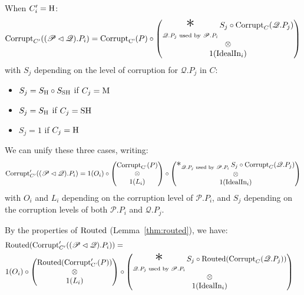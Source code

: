 \begin{theorem}
When $C'_i = \text{H}$:
$$
\tx{Corrupt}_{C'}((\mathscr{P} \lhd \mathscr{Q}).P_i) =
  \tx{Corrupt}_{\tx{C'}}(P)
\circ
\begin{pmatrix}
\displaystyle \bigast_{\mathscr{Q}.P_j \tx{ used by } \mathscr{P}.P_i}
  S_j \circ \tx{Corrupt}_C(\mathscr{Q}.P_j)\cr
\otimes\cr
1(\tx{IdealIn}_i)
\end{pmatrix}
$$
with $S_j$ depending on the level of corruption for $\mathscr{Q}.P_j$ in $C$:
\begin{itemize}
  \item $S_j = S_{\text{H}} \circ S_{\text{SH}}$ if $C_j = \text{M}$
  \item $S_j = S_{\text{H}}$ if $C_j = \text{SH}$
  \item $S_j = 1$ if $C_j = \text{H}$
\end{itemize}

We can unify these three cases, writing:
$$
\tx{Corrupt}'_{C'}((\mathscr{P} \lhd \mathscr{Q}).P_i) =
1(O_i) \circ
\begin{pmatrix}
  \tx{Corrupt}_{\tx{C'}}(P)\cr
  \otimes\cr
  1(L_i)
\end{pmatrix}
\circ
\begin{pmatrix}
\bigast_{\mathscr{Q}.P_j \tx{ used by } \mathscr{P}.P_i}
  S_j \circ \tx{Corrupt}_C(\mathscr{Q}.P_j)\cr
  \otimes\cr
1(\tx{IdealIn}_i)
\end{pmatrix}
$$
with $O_i$ and $L_i$ depending on the corruption level of $\mathscr{P}.P_i$,
and $S_j$ depending on the corruption levels of both $\mathscr{P}.P_i$
and $\mathscr{Q}.P_j$.

By the properties of $\text{Routed}$ (Lemma~\ref{thm:routed}), we have:
$$
\begin{aligned}
&\tx{Routed}(\tx{Corrupt}'_{C'}((\mathscr{P} \lhd \mathscr{Q}).P_i)) =\cr
&1(O_i) \circ
\begin{pmatrix}
  \tx{Routed}(\tx{Corrupt}'_{\tx{C'}}(P))\cr
  \otimes\cr
  1(L_i)
\end{pmatrix}
\circ
\begin{pmatrix}
\displaystyle\bigast_{\mathscr{Q}.P_j \tx{ used by } \mathscr{P}.P_i}
  S_j \circ \tx{Routed}(\tx{Corrupt}_C(\mathscr{Q}.P_j))\cr
  \otimes\cr
1(\tx{IdealIn}_i)
\end{pmatrix}
\end{aligned}
$$


\end{theorem}
